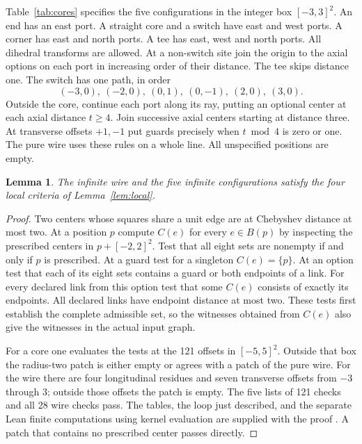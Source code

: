 \documentclass[11pt]{article}
\newtheorem{lemma}[theorem]{Lemma}
\begin{document}
Table~\ref{tab:cores} specifies the five configurations in the integer box \([-3,3]^2\). An end has an east port. A straight core and a switch have east and west ports. A corner has east and north ports. A tee has east, west and north ports. All dihedral transforms are allowed. At a non-switch site join the origin to the axial options on each port in increasing order of their distance. The tee skips distance one. The switch has one path, in order
\[
 (-3,0),\ (-2,0),\ (0,1),\ (0,-1),\ (2,0),\ (3,0).
\]
Outside the core, continue each port along its ray, putting an optional center at each axial distance \(t\ge4\). Join successive axial centers starting at distance three. At transverse offsets \(+1,-1\) put guards precisely when \(t\bmod4\) is zero or one. The pure wire uses these rules on a whole line. All unspecified positions are empty.



\begin{lemma}\label{lem:stencils}
The infinite wire and the five infinite configurations satisfy the four local criteria of Lemma~\ref{lem:local}.
\end{lemma}
\begin{proof}
Two centers whose squares share a unit edge are at Chebyshev distance at most two. At a position \(p\) compute \(C(e)\) for every \(e\in B(p)\) by inspecting the prescribed centers in \(p+[-2,2]^2\). Test that all eight sets are nonempty if and only if \(p\) is prescribed. At a guard test for a singleton \(C(e)=\{p\}\). At an option test that each of its eight sets contains a guard or both endpoints of a link. For every declared link from this option test that some \(C(e)\) consists of exactly its endpoints. All declared links have endpoint distance at most two. These tests first establish the complete admissible set, so the witnesses obtained from \(C(e)\) also give the witnesses in the actual input graph.

For a core one evaluates the tests at the 121 offsets in \([-5,5]^2\). Outside that box the radius-two patch is either empty or agrees with a patch of the pure wire. For the wire there are four longitudinal residues and seven transverse offsets from \(-3\) through \(3\); outside those offsets the patch is empty. The five lists of 121 checks and all 28 wire checks pass. The tables, the loop just described, and the separate Lean finite computations using kernel evaluation are supplied with the proof \cite{companion}. A patch that contains no prescribed center passes directly.
\end{proof}
\end{document}
